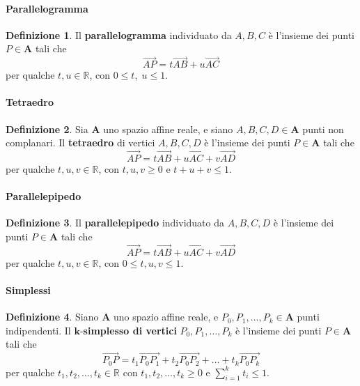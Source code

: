 \documentclass{article}
\theoremstyle{plain}
\theoremstyle{definition}
\newtheorem{defn}{Definizione}[section]
\theoremstyle{remark}
\begin{document}
\vspace{10pt}

\paragraph{Parallelogramma}
\begin{bxthm}
\begin{defn}
Il \textbf{parallelogramma} individuato da $A,B,C$ è l'insieme dei punti $P\in\mathbf{A}$ tali che 
\[\overrightarrow{AP}=t\overrightarrow{AB}+u\overrightarrow{AC}\]
per qualche $t,u\in\mathbb{R}$, con $0\leq t,\;u\leq1$.    
\end{defn}
\end{bxthm}

\vspace{10pt}

\paragraph{Tetraedro}
\begin{bxthm}
\begin{defn}
Sia $\mathbf{A}$ uno spazio affine reale, e siano $A,B,C,D\in\mathbf{A}$ punti non complanari. 
Il \textbf{tetraedro} di vertici $A,B,C,D$ è l'insieme dei punti $P\in\mathbf{A}$ tali che 
\[\overrightarrow{AP}=t\overrightarrow{AB}+u\overrightarrow{AC}+v\overrightarrow{AD}\]
per qualche $t,u,v\in\mathbb{R}$, con $t, u, v\geq0$ e $t+u+v\leq 1$.    
\end{defn}
\end{bxthm}

\vspace{10pt}

\paragraph{Parallelepipedo}
\begin{bxthm}
\begin{defn}
Il \textbf{parallelepipedo} individuato da $A,B,C,D$ è l'insieme dei punti $P\in\mathbf{A}$ tali che
\[\overrightarrow{AP}=t\overrightarrow{AB}+u\overrightarrow{AC}+v\overrightarrow{AD}\]
per qualche $t,u,v\in\mathbb{R}$, con $0\leq t,u,v\leq 1$.    
\end{defn}
\end{bxthm}

\vspace{10pt}

\paragraph{Simplessi}
\begin{bxthm}
\begin{defn}
Siano $\mathbf{A}$ uno spazio affine reale, e $P_0,P_1,\ldots,P_k\in\mathbf{A}$ punti indipendenti. Il $\mathbf{k}
$-\textbf{simplesso di vertici} $P_0,P_1,\ldots,P_k$ è l'insieme dei punti $P\in\mathbf{A}$ tali che 
\[\overrightarrow{P_0P}=t_1\overrightarrow{P_0P_1}+t_2\overrightarrow{P_0P_2}+\ldots+t_k\overrightarrow{P_0P_k}\]
per qualche $t_1,t_2,\ldots,t_k\in\mathbb{R}$ con $t_1,t_2,\ldots,t_k\geq0$ e $\sum_{i=1}^{k}t_i\leq1$.    
\end{defn}
\end{bxthm}
\end{document}
